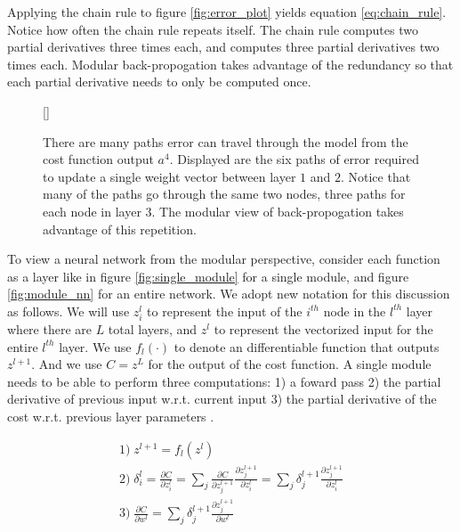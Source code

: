 \message{ !name(main.tex)}\documentclass[11pt]{article}
\begin{document}
Applying the chain rule to figure \ref{fig:error_plot} yields equation \ref{eq:chain_rule}. Notice how often the chain rule repeats itself. The chain rule computes two partial derivatives three times each, and computes three partial derivatives two times each. Modular back-propogation takes advantage of the redundancy so that each partial derivative needs to only be computed once.

\begin{figure}[H]
  [\FBwidth]
  {\caption{There are many paths error can travel through the model from the cost function output $a^{4}$. Displayed are the six paths of error required to update a single weight vector between layer $1$ and $2$. Notice that many of the paths go through the same two nodes, three paths for each node in layer $3$. The modular view of back-propogation takes advantage of this repetition.}\label{fig:error_paths}}{}
\end{figure}

\par
To view a neural network from the modular perspective, consider each function as a layer like in figure \ref{fig:single_module} for a single module, and figure \ref{fig:module_nn} for an entire network. We adopt new notation for this discussion as follows. We will use $z_{i}^{l}$ to represent the input of the $i^{th}$ node in the $l^{th}$ layer where there are $L$ total layers, and $z^{l}$ to represent the vectorized input for the entire $l^{th}$ layer. We use $f_{l}(\cdotp)$ to denote an differentiable function that outputs $z^{l+1}$. And we use $C = z^{L}$ for the output of the cost function. A single module needs to be able to perform three computations: 1) a foward pass 2) the partial derivative of previous input w.r.t. current input 3) the partial derivative of the cost w.r.t. previous layer parameters \cite{Freitas}.

\begin{gather}
  1) \; z^{l+1}=f_{l}(z^{l})\label{eq:mod_1} \\
  2) \; \delta_{i}^{l} = \frac{\partial C}{\partial z_{i}^{l}} = \sum_{j} \frac{\partial C}{\partial z_{j}^{l+1}} \frac{\partial z_{j}^{l+1}}{\partial z_{i}^{l}} = \sum_{j}\delta_{j}^{l+1}\frac{\partial z_{j}^{l+1}}{\partial z_{i}^{l}}\label{eq:mod_2}\\
  3) \; \frac{\partial C}{\partial w^{l}} = \sum_{j} \delta_{j}^{l+1}\frac{\partial z_{j}^{l+1}}{\partial w^{l}}\label{eq:mod_3}
\end{gather}
\end{document}
